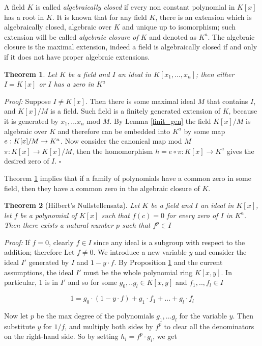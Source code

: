 \documentclass[a4paper,12pt,oneside]{book}
\newtheorem{theorem}{Theorem}[chapter]
\newcommand*{\QED}{\hfill\ensuremath{\square}}
\begin{document}
A field $K$ is called \textit{algebraically closed} if every non constant polynomial in $K[x]$ has a root in $K$. It is known that for any field $K$, there is an extension which is algebraically closed, algebraic over $K$ and unique up to isomorphism;  such extension will be called \textit{algebraic closure of $K$} and denoted as $K^a$. The algebraic closure is the maximal extension, indeed a field is algebraically closed if and only if it does not have proper algebraic extensions. 

\begin{theorem}\label{zeros}
Let $K$ be a field and $I$ an ideal in $K[x_1,...,x_n]$; then either $I=K[x]$ or $I$ has a zero in $K^a$
\end{theorem}

\textit{Proof:}
Suppose $I\neq K[x]$. Then there is some maximal ideal $M$ that contains $I$, and $K[x]/M$ is a field. Such field is a finitely generated extension of $K$, because it is generated by $x_1, ... x_n$ mod $M$. By Lemma \ref{finit_gen} the field $K[x]/M$ is algebraic over $K$ and therefore can be embedded into $K^a$ by some map $e:K[x]/M \rightarrow\nobreak K^a$. Now consider the canonical map mod $M$  $\pi : K[x] \rightarrow K[x]/M$, then the homomorphism $h=e\circ\pi : K[x]\rightarrow K^a$ gives the desired zero of $I$. \QED

Theorem \ref{zeros} implies that if a family of polynomials have a common zero in some field, then they have a common zero in the algebraic closure of $K$. 

\begin{theorem}[Hilbert's Nullstellensatz]\label{langsnulls}
Let $K$ be a field and $I$ an ideal in $K[x]$, let $f$ be a polynomial of $K[x]$ such that $f(c)=0$ for every zero of $I$ in $K^a$. Then there exists a natural number $p$ such that $f^p\in I$
\end{theorem}

\textit{Proof:} If $f=0$, clearly $f\in I$ since any ideal is a subgroup with respect to the addition; therefore  Let $f\neq 0$. We introduce a new variable $y$ and consider the ideal $I'$ generated by $I$ and $1-y\cdot f$. By Proposition \ref{zeros} and the current assumptions, the ideal $I'$ must be the whole polynomial ring $K[x,y]$. In particular, 1 is in $I'$ and so for some $g_0,..g_l\in K[x,y]$ and $f_1,..,f_l\in I$

$$ 1= g_0 \cdot (1-y\cdot f) + g_1\cdot f_1 + ...+ g_l\cdot f_l  $$ 

\noindent Now let $p$ be the max degree of the polynomials $g_1,...g_l$ for the variable $y$. Then
substitute $y$ for $1/f$, and multiply both sides by  $f^p$ to clear all the denominators on the right-hand side. So by setting $h_i= f^p \cdot g_i$, we get
\end{document}
